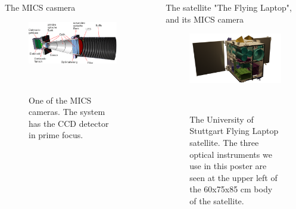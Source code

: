 \documentclass[final,hyperref={pdfpagelabels=false}]{beamer}
\begin{document}
\begin{frame}[t]
\begin{columns}[t]
\begin{column}{.23\textwidth}
\begin{block}{The MICS casmera}
\begin{figure}
\includegraphics[scale=0.56]{fig/mics_schnittansicht.png}
\caption{One of the MICS cameras. The system has the CCD detector in prime focus.}~\label{fig:MICS}
\end{figure}
\end{block}

\end{column}




\begin{column}{.01\textwidth}\end{column} %
 
\begin{column}{.23\textwidth} %



\begin{block}{The satellite "The Flying Laptop", and its MICS camera}
\begin{figure}
\includegraphics[scale=6]{fig/flp_inside.png}
\caption{The University of Stuttgart Flying Laptop satellite. The three optical instruments we use in this poster are seen at the upper left of the 60x75x85 cm body of the satellite.}~\label{fig:flp}
\end{figure}


\end{block}
\end{column}
\end{columns}
\end{frame}
\end{document}
